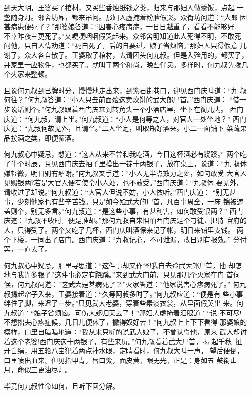 到天大明，王婆买了棺材，又买些香烛纸钱之类，归来与那妇人做羹饭，点起
一盏随身灯。邻舍坊厢，都来吊问。那妇人虚掩着粉脸假哭。众街坊问道：“大郎
因甚病患便死了？”那婆娘答道：“因害心疼病症，一日日越重了，看看不能够好，
不幸昨夜三更死了。”又哽哽咽咽假哭起来。众邻舍明知道此人死得不明，不敢死
问他，只自人情劝道：“死自死了，活的自要过，娘子省烦恼。”那妇人只得假意
儿谢了，众人各自散了。王婆取了棺材，去请团头何九叔。但是入殓用的，都买了，
并家里一应物件，也都买了。就叫了两个和尚，晚些伴灵。多样时，何九叔先拨几
个火家来整顿。

且说何九叔到巳牌时分，慢慢地走出来，到紫石街巷口，迎见西门庆叫道：“九
叔何往？”何九叔答道：“小人只去前面殓这卖炊饼的武大郎尸首。”西门庆道：
“借一步说话则个。”何九叔跟着西门庆来到转角头一个小酒店里，坐下在阁儿内。
西门庆道：“何九叔，请上坐。”何九叔道：“小人是何等之人，对官人一处坐地？”
西门庆道：“九叔何故见外，且请坐。”二人坐定，叫取瓶好酒来。小二一面铺下
菜蔬果品按酒之类，即便筛酒。

何九叔心中疑忌，想道：“这人从来不曾和我吃酒，今日这杯酒必有跷蹊。”
两个吃了半个时辰，只见西门庆去袖子里摸出一锭十两银子，放在桌上，说道：“九
叔休嫌轻微，明日别有酬谢。”何九叔叉手道：“小人无半点效力之处，如何敢受
大官人见赐银两?若是大官人便有使令小人处，也不敢受。”西门庆道：“九叔休
要见外，请收过了却说。”何九叔道：“大官人但说不妨，小人依听。”西门庆道：
“别无甚事，少刻他家也有些辛苦钱。只是如今殓武大的尸首，凡百事周全，一床
锦被遮盖则个，别无多言。”何九叔道：“是这些小事，有甚利害，如何敢受银两？”
西门庆道：“九叔不收时，便是推却。”那何九叔自来惧怕西门庆是个刁徒，把持
官府的人，只得受了。两个又吃了几杯，西门庆叫酒保来记了帐，明日来铺里支钱。
两个下楼，一同出了店门。西门庆道：“九叔记心，不可泄漏，改日别有报效。”
分付罢，一直去了。

何九叔心中疑忌，肚里寻思道：“这件事却又作怪!我自去殓武大郎尸首，他
却怎地与我许多银子?这件事必定有跷蹊。”来到武大门前，只见那几个火家在门
首伺候，何九叔问道：“这武大是甚病死了？”火家答道：“他家说害心疼病死了。”
何九叔揭起帘子入来，王婆接着道：“久等阿叔多时了。”何九叔应道：“便是有
些小事绊住了脚，来迟了一步。”只见武大老婆，穿着些素淡衣裳，从里面假哭出
来。何九叔道：“娘子省烦恼。可伤大郎归天去了！”那妇人虚掩着泪眼道：“说
不可尽!不想拙夫心疼症候，几日儿便休了，撇得奴好苦！”何九叔上上下下看得
那婆娘的模样，口里自暗暗地道：“我从来只听的说武大娘子，不曾认得他，原来
武大却讨着这个老婆!西门庆这十两银子，有些来历。”何九叔看着武大尸首，揭
起千秋，扯开白绢，用五轮八宝犯着两点神水眼，定睛看时，何九叔大叫一声，
望后便倒，口里喷出血来。但见指甲青，唇口紫，面皮黄，眼无光，正是：身如五
鼓衔山月，命似三更油尽灯。

毕竟何九叔性命如何，且听下回分解。